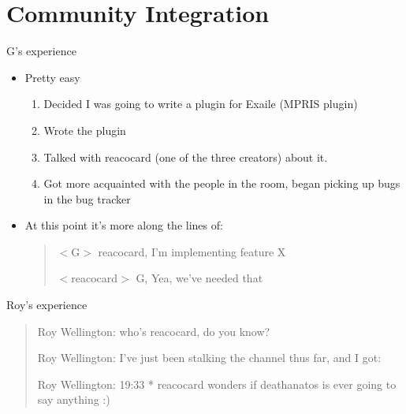 \documentclass{beamer}
\begin{document}
\section{Community Integration}
\begin{frame}{G's experience}
  \begin{itemize}
    \item Pretty easy
    \begin{enumerate}
      \item Decided I was going to write a plugin for Exaile (MPRIS plugin)
      \item Wrote the plugin
      \item Talked with reacocard (one of the three creators) about it.
      \item Got more acquainted with the people in the room, began picking
        up bugs in the bug tracker
    \end{enumerate}
    \item At this point it's more along the lines of:
\begin{verse}
  $<$G$>$ reacocard, I'm implementing feature X

  $<$reacocard$>$ G, Yea, we've needed that
\end{verse}
  \end{itemize}
\end{frame}

\begin{frame}{Roy's experience}
\begin{quote}
Roy Wellington: who's reacocard, do you know?

Roy Wellington: I've just been stalking the channel thus far, and I got:

Roy Wellington: 19:33  * reacocard wonders if deathanatos is ever going to say anything :)
\end{quote}
\end{frame}
\end{document}
